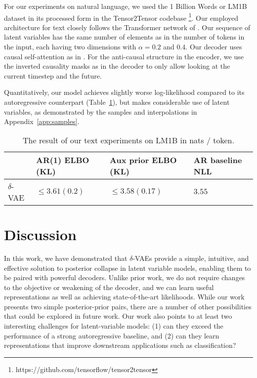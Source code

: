 \documentclass{article} \usepackage{iclr2019_conference,times}
\newcommand{\tblref}[1]{Table~\ref{#1}}
\newcommand{\aref}[1]{Appendix~\ref{#1}}
\begin{document}
For our experiments on natural language, we used the 1 Billion Words or LM1B \citep{lm1b} dataset in its processed form in the Tensor2Tensor \citep{tensor2tensor} codebase \footnote{https://github.com/tensorflow/tensor2tensor}. 
Our employed architecture for text closely follows the Transformer network of \cite{Vaswani2017}. Our sequence of latent variables has the same number of elements as in the number of tokens in the input, each having two dimensions with $\alpha=0.2$ and $0.4$. Our decoder uses causal self-attention as in \cite{Vaswani2017}. For the anti-causal structure in the encoder, we use the inverted causality masks as in the decoder to only allow looking at the current timestep and the future. 
\par
Quantitatively, our model achieves slightly worse log-likelihood compared to its autoregressive counterpart (\tblref{tbl:lm1b}), but makes considerable use of latent variables, as demonstrated by the samples and interpolations in \aref{app:samples}.
\begin{table}[ht]
\centering
\begin{tabular}{@{}l|lll@{}}
    & AR(1) ELBO (KL)  & Aux prior ELBO (KL) &  AR baseline NLL  \\
\hline    
$\delta$-VAE   &  $\le 3.61 (0.2)$ &  $\le 3.58(0.17)$ & $3.55$ \\
\bottomrule
\end{tabular}
\caption{The result of our text experiments on LM1B in nats / token.}
\label{tbl:lm1b}
\end{table}

 \section{Discussion}
In this work, we have demonstrated that $\delta$-VAEs provide a simple, intuitive, and effective solution to posterior collapse in latent variable models, enabling them to be paired with powerful decoders. Unlike prior work, we do not require changes to the objective or weakening of the decoder, and we can learn useful representations as well as achieving state-of-the-art likelihoods. While our work presents two simple posterior-prior pairs, there are a number of other possibilities that could be explored in future work. Our work also points to at least two interesting challenges for latent-variable models: (1) can they exceed the performance of a strong autoregressive baseline, and (2) can they learn representations that improve downstream applications such as classification? 
\end{document}
